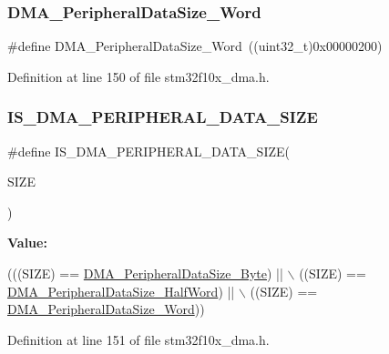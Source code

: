 \subsubsection{\texorpdfstring{D\+M\+A\+\_\+\+Peripheral\+Data\+Size\+\_\+\+Word}{DMA\_PeripheralDataSize\_Word}}
{\footnotesize\ttfamily \#define D\+M\+A\+\_\+\+Peripheral\+Data\+Size\+\_\+\+Word~((uint32\+\_\+t)0x00000200)}



Definition at line 150 of file stm32f10x\+\_\+dma.\+h.

\mbox{\label{group___d_m_a__peripheral__data__size_gad7916e0ae55cdf5efdfa68a09a028037}} 
\subsubsection{\texorpdfstring{I\+S\+\_\+\+D\+M\+A\+\_\+\+P\+E\+R\+I\+P\+H\+E\+R\+A\+L\+\_\+\+D\+A\+T\+A\+\_\+\+S\+I\+ZE}{IS\_DMA\_PERIPHERAL\_DATA\_SIZE}}
{\footnotesize\ttfamily \#define I\+S\+\_\+\+D\+M\+A\+\_\+\+P\+E\+R\+I\+P\+H\+E\+R\+A\+L\+\_\+\+D\+A\+T\+A\+\_\+\+S\+I\+ZE(\begin{DoxyParamCaption}\item[{}]{S\+I\+ZE }\end{DoxyParamCaption})}

{\bfseries Value\+:}
\begin{DoxyCode}
(((SIZE) == \hyperlink{group___d_m_a__peripheral__data__size_ga7577035ae4ff413164000227a8cea346}{DMA\_PeripheralDataSize\_Byte}) || \(\backslash\)
                                           ((SIZE) == 
      \hyperlink{group___d_m_a__peripheral__data__size_gab1988e5005ee65c261018f62866e4585}{DMA\_PeripheralDataSize\_HalfWord}) || \(\backslash\)
                                           ((SIZE) == 
      \hyperlink{group___d_m_a__peripheral__data__size_ga516ea7a40945d8325fe73e079b245ea1}{DMA\_PeripheralDataSize\_Word}))
\end{DoxyCode}


Definition at line 151 of file stm32f10x\+\_\+dma.\+h.


